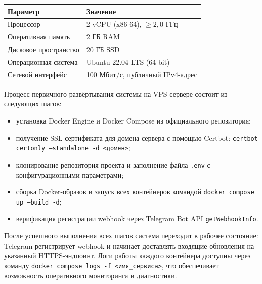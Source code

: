 {{\begin{Center}
		\renewcommand{\arraystretch}{1.4} %
		\begin{tabular}{|l|l|}
			\hline
			Параметр                & Значение                            \\ \hline
			Процессор               & 2 vCPU (x86-64), $\geq 2,0$ ГГц    \\ \hline
			Оперативная память      & 2 ГБ RAM                            \\ \hline
			Дисковое пространство   & 20 ГБ SSD                           \\ \hline
			Операционная система    & Ubuntu 22.04 LTS (64-bit)           \\ \hline
			Сетевой интерфейс       & 100 Мбит/с, публичный IPv4-адрес    \\ \hline
		\end{tabular}
	\end{Center}}
	\botTablespace \addtocounter{tablecntr}{1}

	\par \redline Процесс первичного развёртывания системы на VPS-сервере состоит из следующих шагов:

	\begin{itemize}[leftmargin=2.15cm, labelwidth=0.65cm, labelsep=0.0cm]

		\item[\theitemcntr.] установка Docker Engine и Docker Compose из официального репозитория;
		\addtocounter{itemcntr}{1}

		\item[\theitemcntr.] получение SSL-сертификата для домена сервера с помощью Certbot: \texttt{certbot certonly --standalone -d <домен>};
		\addtocounter{itemcntr}{1}

		\item[\theitemcntr.] клонирование репозитория проекта и заполнение файла \texttt{.env} с конфигурационными параметрами;
		\addtocounter{itemcntr}{1}

		\item[\theitemcntr.] сборка Docker-образов и запуск всех контейнеров командой \texttt{docker compose up --build -d};
		\addtocounter{itemcntr}{1}

		\item[\theitemcntr.] верификация регистрации webhook через Telegram Bot API \texttt{getWebhookInfo}.
		\addtocounter{itemcntr}{1}

	\end{itemize} \setcounter{itemcntr}{1}

	\par \redline После успешного выполнения всех шагов система переходит в рабочее состояние: Telegram регистрирует webhook и начинает доставлять входящие обновления на указанный HTTPS-эндпоинт.
	Логи работы каждого контейнера доступны через команду \texttt{docker compose logs -f <имя\_сервиса>}, что обеспечивает возможность оперативного мониторинга и диагностики.
	\par
}

